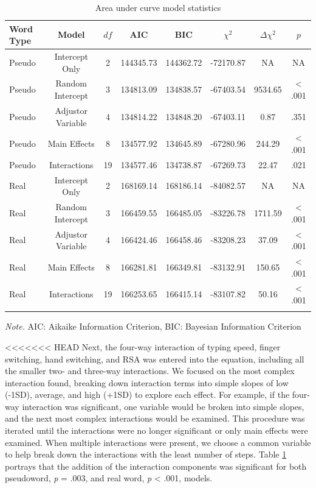 \documentclass[english,man]{apa6}
\theoremstyle{definition}
\theoremstyle{definition}
\theoremstyle{definition}
\theoremstyle{remark}
\begin{document}
\begin{table}[tbp]
\begin{center}
\begin{threeparttable}
\caption{\label{tab:model-table1}Area under curve model statistics}
\begin{tabular}{lccccccc}
\toprule
Word Type & Model & $df$ & AIC & BIC & $\chi^2$ & $\Delta\chi^2$ & $p$\\
\midrule
Pseudo & Intercept Only & 2 & 144345.73 & 144362.72 & -72170.87 & NA & NA\\
Pseudo & Random Intercept & 3 & 134813.09 & 134838.57 & -67403.54 & 9534.65 & < .001\\
Pseudo & Adjustor Variable & 4 & 134814.22 & 134848.20 & -67403.11 & 0.87 & .351\\
Pseudo & Main Effects & 8 & 134577.92 & 134645.89 & -67280.96 & 244.29 & < .001\\
Pseudo & Interactions & 19 & 134577.46 & 134738.87 & -67269.73 & 22.47 & .021\\
Real & Intercept Only & 2 & 168169.14 & 168186.14 & -84082.57 & NA & NA\\
Real & Random Intercept & 3 & 166459.55 & 166485.05 & -83226.78 & 1711.59 & < .001\\
Real & Adjustor Variable & 4 & 166424.46 & 166458.46 & -83208.23 & 37.09 & < .001\\
Real & Main Effects & 8 & 166281.81 & 166349.81 & -83132.91 & 150.65 & < .001\\
Real & Interactions & 19 & 166253.65 & 166415.14 & -83107.82 & 50.16 & < .001\\
\bottomrule
\addlinespace
\end{tabular}
\begin{tablenotes}[para]
\textit{Note.} AIC: Aikaike Information Criterion, BIC: Bayesian Information Criterion
\end{tablenotes}
\end{threeparttable}
\end{center}
\end{table}

\textless{}\textless{}\textless{}\textless{}\textless{}\textless{}\textless{}
HEAD Next, the four-way interaction of typing speed, finger switching,
hand switching, and RSA was entered into the equation, including all the
smaller two- and three-way interactions. We focused on the most complex
interaction found, breaking down interaction terms into simple slopes of
low (-1SD), average, and high (+1SD) to explore each effect. For
example, if the four-way interaction was significant, one variable would
be broken into simple slopes, and the next most complex interactions
would be examined. This procedure was iterated until the interactions
were no longer significant or only main effects were examined. When
multiple interactions were present, we choose a common variable to help
break down the interactions with the least number of steps. Table
\ref{tab:model-table1} portrays that the addition of the interaction
components was significant for both pseudoword, \emph{p} = .003, and
real word, \emph{p} \textless{} .001, models.
\end{document}
